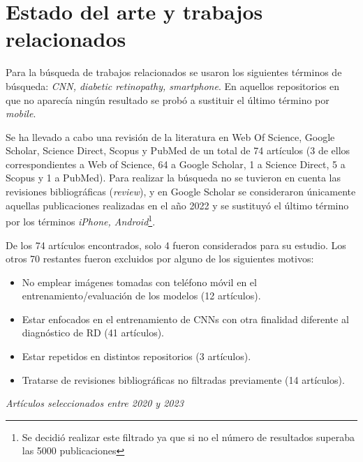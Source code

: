 \titlespacing{\section}{0pt}{0.25cm}{0.15cm}
\section{Estado del arte y trabajos relacionados}

Para la búsqueda de trabajos relacionados se usaron los siguientes términos de búsqueda: \textit{CNN, diabetic retinopathy, smartphone}. En aquellos repositorios en que no aparecía ningún resultado se probó a sustituir el último término por \textit{mobile}.

Se ha llevado a cabo una revisión de la literatura en Web Of Science, Google Scholar, Science Direct, Scopus y PubMed de un total de 74 artículos (3 de ellos correspondientes a Web of Science, 64 a Google Scholar, 1 a Science Direct, 5 a Scopus y 1 a PubMed). Para realizar la búsqueda no se tuvieron en cuenta las revisiones bibliográficas (\textit{review}), y en Google Scholar se consideraron únicamente aquellas publicaciones realizadas en el año 2022 y se sustituyó el último término por los términos \textit{iPhone, Android}\footnote{Se decidió realizar este filtrado ya que si no el número de resultados superaba las 5000 publicaciones}.

De los 74 artículos encontrados, solo 4 fueron considerados para su estudio. Los otros 70 restantes fueron excluidos por alguno de los siguientes motivos:

\begin{itemize} [itemsep=0.25em]
    \item No emplear imágenes tomadas con teléfono móvil en el entrenamiento/evaluación de los modelos (12 artículos).
    \item Estar enfocados en el entrenamiento de CNNs con otra finalidad diferente al diagnóstico de RD (41 artículos).
    \item Estar repetidos en distintos repositorios (3 artículos).
    \item Tratarse de revisiones bibliográficas no filtradas previamente (14 artículos).
\end{itemize}

\newpage
\textit{Artículos seleccionados entre 2020 y 2023}

